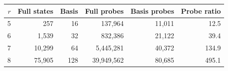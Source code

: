 \begin{tabular}{rrrrrr}
\toprule
$r$ & Full states & Basis & Full probes & Basis probes & Probe ratio \\
\midrule
5 & 257 & 16 & 137,964 & 11,011 & 12.5 \\
6 & 1,539 & 32 & 832,386 & 21,122 & 39.4 \\
7 & 10,299 & 64 & 5,445,281 & 40,372 & 134.9 \\
8 & 75,905 & 128 & 39,949,562 & 80,685 & 495.1 \\
\bottomrule
\end{tabular}
